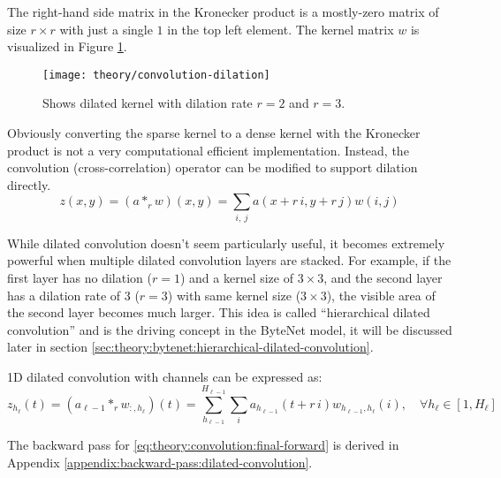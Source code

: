 The right-hand side matrix in the Kronecker product is a mostly-zero matrix of size $r \times r$ with just a single $1$ in the top left element. The kernel matrix $w$ is visualized in Figure \ref{fig:convolution:dilation}.

\begin{figure}[h]
	\centering
	\texttt{[image: theory/convolution-dilation]}
	\caption{Shows dilated kernel with dilation rate $r = 2$ and $r = 3$.}
	\label{fig:convolution:dilation}
\end{figure}

Obviously converting the sparse kernel to a dense kernel with the Kronecker product is not a very computational efficient implementation. Instead, the convolution (cross-correlation) operator can be modified to support dilation directly.
\begin{equation}
z(x, y) = (a *_r w)(x, y) = \sum_{i,\ j} a(x + r\, i, y + r\, j) w(i, j)
\end{equation}

While dilated convolution doesn't seem particularly useful, it becomes extremely powerful when multiple dilated convolution layers are stacked. For example, if the first layer has no dilation ($r = 1$) and a kernel size of $3 \times 3$, and the second layer has a dilation rate of 3 ($r = 3$) with same kernel size ($3 \times 3$), the visible area of the second layer becomes much larger. This idea is called ``hierarchical dilated convolution'' and is the driving concept in the ByteNet model, it will be discussed later in section \ref{sec:theory:bytenet:hierarchical-dilated-convolution}.

1D dilated convolution with channels can be expressed as:
\begin{equation}
z_{h_\ell}(t) = (a_{\ell-1} *_r w_{:, h_\ell})(t) = \sum_{h_{\ell-1}}^{H_{\ell-1}} \sum_{i} a_{h_{\ell-1}}(t + r\,i) w_{h_{\ell-1}, h_\ell}(i), \quad \forall h_\ell \in [1, H_\ell]
\label{eq:theory:convolution:final-forward}
\end{equation}

The backward pass for \eqref{eq:theory:convolution:final-forward} is derived in Appendix \ref{appendix:backward-pass:dilated-convolution}.
